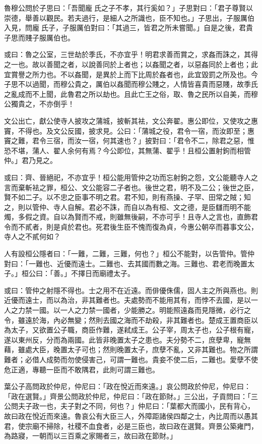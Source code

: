 
\begin{pinyinscope}
魯穆公問於子思曰：「吾聞龐𥼴氏之子不孝，其行奚如？」子思對曰：「君子尊賢以崇德，舉善以觀民。若夫過行，是細人之所識也，臣不知也。」子思出，子服厲伯入見，問龐𥼴氏子，子服厲伯對曰：「其過三，皆君之所未嘗聞。」自是之後，君貴子思而賤子服厲伯也。


或曰：魯之公室，三世劫於季氏，不亦宜乎！明君求善而賞之，求姦而誅之，其得之一也。故以善聞之者，以說善同於上者也；以姦聞之者，以惡姦同於上者也；此宜賞譽之所力也。不以姦聞，是異於上而下比周於姦者也，此宜毀罰之所及也。今子思不以過聞，而穆公貴之，厲伯以姦聞而穆公賤之，人情皆喜貴而惡賤，故季氏之亂成而不上聞，此魯君之所以劫也。且此亡王之俗，取、魯之民所以自美，而穆公獨貴之，不亦倒乎！


文公出亡，獻公使寺人披攻之蒲城，披斬其袪，文公奔翟。惠公即位，又使攻之惠竇，不得也。及文公反國，披求見。公曰：「蒲城之役，君令一宿，而汝即至；惠竇之難，君令三宿，而汝一宿，何其速也？」披對曰：「君令不二，除君之惡，惟恐不堪，蒲人、翟人余何有焉？今公即位，其無蒲、翟乎！且桓公置射鉤而相管仲。」君乃見之。


或曰：齊、晉絕祀，不亦宜乎！桓公能用管仲之功而忘射鉤之怨，文公能聽寺人之言而棄斬袪之罪，桓公、文公能容二子者也。後世之君，明不及二公；後世之臣，賢不如二子。以不忠之臣事不明之君。君不知，則有燕操、子罕、田常之賊；知之，則以管仲、寺人自解。君必不誅，而自以為有桓、文之德，是臣讎而明不能燭，多假之資。自以為賢而不戒，則雖無後嗣，不亦可乎！且寺人之言也，直飾君令而不貳者，則是貞於君也。死君後生臣不愧而復為貞，今惠公朝卒而暮事文公，寺人之不貳何如？

人有設桓公隱者曰：「一難，二難，三難，何也？」桓公不能對，以告管仲。管仲對曰：「一難也、近優而遠士。二難也、去其國而數之海。三難也、君老而晚置太子。」桓公曰：「善。」不擇日而廟禮太子。


或曰：管仲之射隱不得也。士之用不在近遠。而俳優侏儒，固人主之所與燕也。則近優而遠士，而以為治，非其難者也。夫處勢而不能用其有，而悖不去國，是以一人之力禁一國。以一人之力禁一國者，少能勝之。明能照遠姦而見隱微，必行之令，雖遠於海，內必無變；然則去國之海而不劫殺，非其難者也。楚成王置商臣以為太子，又欲置公子職，商臣作難，遂弒成王。公子宰，周太子也，公子根有寵，遂以東州反，分而為兩國。此皆非晚置太子之患也。夫分勢不二，庶孽卑，寵無藉，雖處大臣，晚置太子可也；然則晚置太子，庶孽不亂，又非其難也。物之所謂難者；必借人成勢而勿使侵害己，可謂一難也。貴妾不使二后，二難也。愛孽不使危正適，專聽一臣而不敢隅君，此則可謂三難也。


葉公子高問政於仲尼，仲尼曰：「政在悅近而來遠。」哀公問政於仲尼，仲尼曰：「政在選賢。」齊景公問政於仲尼，仲尼曰：「政在節財。」三公出，子貢問曰：「三公問夫子政一也，夫子對之不同，何也？」仲尼曰：「葉都大而國小，民有背心，故曰政在悅近而來遠。魯哀公有大臣三人，外障距諸侯四鄰之士，內比周而以愚其君，使宗廟不掃除，社稷不血食者，必是三臣也，故曰政在選賢。齊景公築雍門，為路寢，一朝而以三百乘之家賜者三，故曰政在節財。」



\end{pinyinscope}
